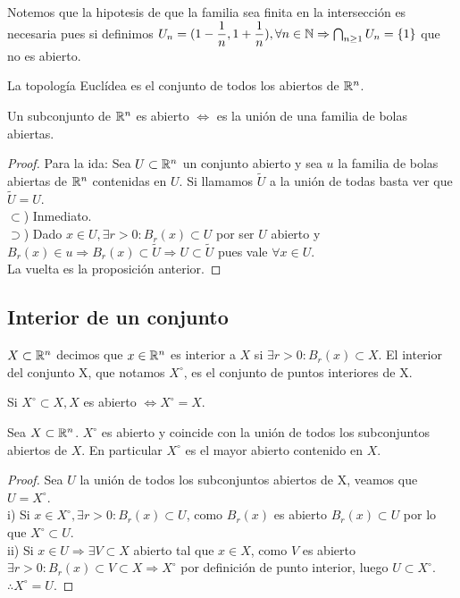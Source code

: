 Notemos que la hipotesis de que la familia sea finita en la intersección es necesaria pues si definimos $U_n = (1 - \dfrac{1}{n}, 1 + \dfrac{1}{n}), \forall n \in \mathbb{N} \Rightarrow \bigcap_{n \geq 1} U_n = \{1\}$ que no es abierto.

\begin{definition}
  La topología Euclídea es el conjunto de todos los abiertos de $\mathbb{R}^n$.
\end{definition}

\clearpage

\begin{corollary}
  Un subconjunto de $\mathbb{R}^n$ es abierto $\iff$ es la unión de una familia de bolas abiertas.
  \begin{proof}
    Para la ida: Sea $U \subset \mathbb{R}^n$ un conjunto abierto y sea $u$ la familia de bolas abiertas de $\mathbb{R}^n$ contenidas en $U$. Si llamamos $\tilde{U}$ a la unión de todas basta ver que $\tilde{U} = U$. \\
    $\subset$) Inmediato. \\
    $\supset$) Dado $x \in U, \exists r > 0 : B_r(x) \subset U$ por ser $U$ abierto y $B_r(x) \in u \Rightarrow B_r(x) \subset \tilde{U} \Rightarrow U \subset \tilde{U}$ pues vale $\forall x \in U$. \\
    La vuelta es la proposición anterior.
  \end{proof}
\end{corollary}

\subsection{Interior de un conjunto}

\begin{definition}[Interior]
  $X \subset \mathbb{R}^n$ decimos que $x \in \mathbb{R}^n$ es interior a $X$ si $\exists r > 0 : B_r(x) \subset X$. El interior del conjunto X, que notamos $X^{\circ}$, es el conjunto de puntos interiores de X.
\end{definition}

\begin{note}
  Si $X^{\circ} \subset X, X$ es abierto $\iff X^{\circ} = X$.
\end{note}

\begin{prop}
  Sea $X \subset \mathbb{R}^n$. $X^{\circ}$ es abierto y coincide con la unión de todos los subconjuntos abiertos de $X$. En particular $X^{\circ}$ es el mayor abierto contenido en $X$.
  \begin{proof}
    Sea $U$ la unión de todos los subconjuntos abiertos de X, veamos que $U = X^{\circ}$. \\
    i) Si $x \in X^{\circ}, \exists r > 0 : B_r(x) \subset U$, como $B_r(x)$ es abierto $B_r(x) \subset U$ por lo que $X^{\circ} \subset U$. \\
    ii) Si $x \in U \Rightarrow \exists V \subset X$ abierto tal que $x \in X$, como $V$ es abierto $\exists r > 0 : B_r(x) \subset V \subset X \Rightarrow X^{\circ}$ por definición de punto interior, luego $U \subset X^{\circ}$. \\
    $\therefore X^{\circ} = U$.
  \end{proof}
\end{prop}

